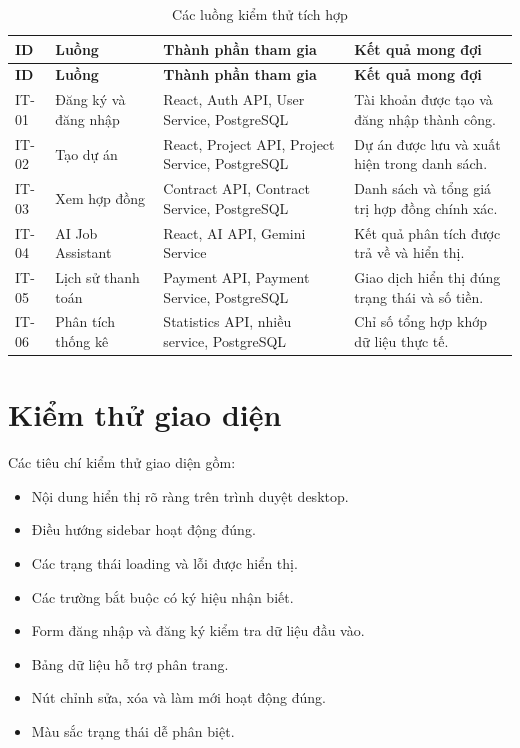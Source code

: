 \begin{longtable}{|p{1.5cm}|p{4.2cm}|p{4.2cm}|p{4.0cm}|}
\caption{Các luồng kiểm thử tích hợp}
\label{tab:chapter6-integration-tests} \\ \hline
\textbf{ID} & \textbf{Luồng} & \textbf{Thành phần tham gia} & \textbf{Kết quả mong đợi} \\ \hline
\endfirsthead
\hline
\textbf{ID} & \textbf{Luồng} & \textbf{Thành phần tham gia} & \textbf{Kết quả mong đợi} \\ \hline
\endhead

IT-01 & Đăng ký và đăng nhập & React, Auth API, User Service, PostgreSQL & Tài khoản được tạo và đăng nhập thành công. \\ \hline
IT-02 & Tạo dự án & React, Project API, Project Service, PostgreSQL & Dự án được lưu và xuất hiện trong danh sách. \\ \hline
IT-03 & Xem hợp đồng & Contract API, Contract Service, PostgreSQL & Danh sách và tổng giá trị hợp đồng chính xác. \\ \hline
IT-04 & AI Job Assistant & React, AI API, Gemini Service & Kết quả phân tích được trả về và hiển thị. \\ \hline
IT-05 & Lịch sử thanh toán & Payment API, Payment Service, PostgreSQL & Giao dịch hiển thị đúng trạng thái và số tiền. \\ \hline
IT-06 & Phân tích thống kê & Statistics API, nhiều service, PostgreSQL & Chỉ số tổng hợp khớp dữ liệu thực tế. \\ \hline
\end{longtable}

\section{Kiểm thử giao diện}
\label{sec:ui-testing-chapter6}

Các tiêu chí kiểm thử giao diện gồm:

\begin{itemize}
    \item Nội dung hiển thị rõ ràng trên trình duyệt desktop.
    \item Điều hướng sidebar hoạt động đúng.
    \item Các trạng thái loading và lỗi được hiển thị.
    \item Các trường bắt buộc có ký hiệu nhận biết.
    \item Form đăng nhập và đăng ký kiểm tra dữ liệu đầu vào.
    \item Bảng dữ liệu hỗ trợ phân trang.
    \item Nút chỉnh sửa, xóa và làm mới hoạt động đúng.
    \item Màu sắc trạng thái dễ phân biệt.
\end{itemize}


